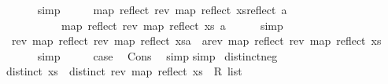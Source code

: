 \begin{isabellebody}
\ \ \ \ \isamarkupfalse%
\ simp\isanewline
\ \ \isamarkupfalse%
\ \isamarkupfalse%
\ {\isachardoublequoteopen}map\ reflect\ {\isacharparenleft}{\kern0pt}{\isacharparenleft}{\kern0pt}rev\ {\isacharparenleft}{\kern0pt}map\ reflect\ xs{\isacharparenright}{\kern0pt}{\isacharparenright}{\kern0pt}{\isacharat}{\kern0pt}{\isacharbrackleft}{\kern0pt}reflect\ a{\isacharbrackright}{\kern0pt}{\isacharparenright}{\kern0pt}\isanewline
\ \ \ \ \ \ \ \ \ {\isacharequal}{\kern0pt}\ {\isacharparenleft}{\kern0pt}map\ reflect\ {\isacharparenleft}{\kern0pt}rev\ {\isacharparenleft}{\kern0pt}map\ reflect\ xs{\isacharparenright}{\kern0pt}{\isacharparenright}{\kern0pt}{\isacharparenright}{\kern0pt}{\isacharat}{\kern0pt}\ {\isacharbrackleft}{\kern0pt}a{\isacharbrackright}{\kern0pt}{\isachardoublequoteclose}\isanewline
\ \ \ \ \isamarkupfalse%
\ simp\isanewline
\ \ \isamarkupfalse%
\ \isamarkupfalse%
\ {\isachardoublequoteopen}rev\ {\isacharparenleft}{\kern0pt}{\isacharparenleft}{\kern0pt}map\ reflect\ {\isacharparenleft}{\kern0pt}rev\ {\isacharparenleft}{\kern0pt}map\ reflect\ xs{\isacharparenright}{\kern0pt}{\isacharparenright}{\kern0pt}{\isacharparenright}{\kern0pt}{\isacharat}{\kern0pt}{\isacharbrackleft}{\kern0pt}a{\isacharbrackright}{\kern0pt}{\isacharparenright}{\kern0pt}\ {\isacharequal}{\kern0pt}\ {\isacharbrackleft}{\kern0pt}a{\isacharbrackright}{\kern0pt}{\isacharat}{\kern0pt}{\isacharparenleft}{\kern0pt}rev\ {\isacharparenleft}{\kern0pt}map\ reflect\ {\isacharparenleft}{\kern0pt}rev\ {\isacharparenleft}{\kern0pt}map\ reflect\ xs{\isacharparenright}{\kern0pt}{\isacharparenright}{\kern0pt}{\isacharparenright}{\kern0pt}{\isacharparenright}{\kern0pt}{\isachardoublequoteclose}\isanewline
\ \ \ \ \isamarkupfalse%
\ simp\isanewline
\ \ \isamarkupfalse%
\ \isamarkupfalse%
\ {\isacharquery}{\kern0pt}case\ \isamarkupfalse%
\ Cons\ \isamarkupfalse%
\ simp\isanewline
{}\isamarkupfalse%
{\isacharparenleft}{\kern0pt}simp{\isacharparenright}{\kern0pt}%
\endisatagproof
{\isafoldproof}%
%
\isadelimproof
\isanewline
%
\endisadelimproof
\isanewline
{}\isamarkupfalse%
\ distinct{\isacharunderscore}{\kern0pt}neg{\isacharcolon}{\kern0pt}\isanewline
{\isachardoublequoteopen}distinct\ xs\ {\isacharequal}{\kern0pt}\ distinct\ {\isacharparenleft}{\kern0pt}rev\ {\isacharparenleft}{\kern0pt}map\ reflect\ {\isacharparenleft}{\kern0pt}xs\ {\isacharcolon}{\kern0pt}{\isacharcolon}{\kern0pt}\ R{}\ list{\isacharparenright}{\kern0pt}{\isacharparenright}{\kern0pt}{\isacharparenright}{\kern0pt}{\isachardoublequoteclose}\isanewline

\end{isabellebody}
